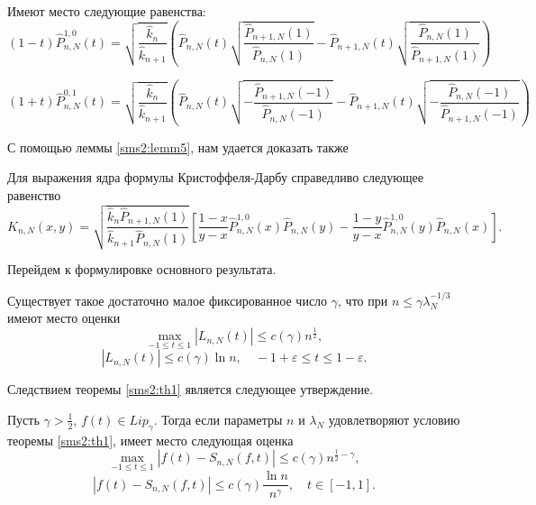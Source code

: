 \begin{lemma}
\label{sms2:lemm5}
Имеют место следующие равенства:
\begin{equation}
\label{SMS2.lemmaf1eq}
(1-t)\hat P_{n,N}^{1,0}(t) =
\sqrt{\frac{\hat{k}_n}{\hat{k}_{n+1}}}
\left(
\hat P_{n,N}(t)\sqrt{\frac{\hat P_{n+1,N}(1)}{\hat P_{n,N}(1)} }
  - \hat P_{n+1,N}(t)\sqrt{ \frac{\hat P_{n,N}(1)}{\hat P_{n+1,N}(1)} }
\right)
\end{equation}


\begin{equation}
\label{SMS2.lemmaf2eq}
(1+t)\hat P_{n,N}^{0,1}(t) =
\sqrt{\frac{\hat{k}_n}{\hat{k}_{n+1}}}
\left(
\hat P_{n,N}(t)\sqrt{-\frac{\hat P_{n+1,N}(-1)}{\hat P_{n,N}(-1)} }
  - \hat P_{n+1,N}(t)\sqrt{ -\frac{\hat P_{n,N}(-1)}{\hat P_{n+1,N}(-1)} }
\right)
\end{equation}
\end{lemma}

\noindent С помощью леммы \ref{sms2:lemm5}, нам удается доказать также

\begin{lemma}
\label{sms2:lemm6}
Для выражения ядра формулы Кристоффеля-Дарбу справедливо следующее равенство
\begin{equation}
\label{SMS2.kristof}
K_{n,N}(x,y) =
\sqrt{\frac{\hat{k}_{n} \hat P_{n+1,N}(1)}{\hat{k}_{n+1} \hat P_{n,N}(1)}}
\left[ \frac{1-x}{y-x}\hat P_{n,N}^{1,0}(x)\hat P_{n,N}(y) - \frac{1-y}{y-x}\hat P_{n,N}^{1, 0}(y)\hat P_{n,N}(x)
\right].
\end{equation}
\end{lemma}


\noindent Перейдем к формулировке основного результата.

\begin{theorem}
\label{sms2:th1}
Существует такое достаточно малое фиксированное число $\gamma$, что при $n \leq \gamma \lambda_N^{-1/3}$ имеют место оценки
\begin{equation*}
\max_{-1\leq t\leq 1} \left| L_{n,N}(t) \right| \leq c(\gamma) n^{\frac12},
\end{equation*}
\begin{equation*}
\left| L_{n,N}(t) \right| \leq c(\gamma) \ln{n}, \quad -1+\varepsilon \leq t \leq 1 - \varepsilon.
\end{equation*}
\end{theorem}

\noindent Следствием теоремы \ref{sms2:th1} является следующее утверждение.


\begin{theorem}
\label{sms2:th2}
Пусть $\gamma > \frac12$, $f(t) \in Lip_{\gamma}$. Тогда если параметры $n$ и $\lambda_N$ удовлетворяют условию теоремы \ref{sms2:th1}, имеет место следующая оценка
\begin{equation*}
\max_{-1\leq t\leq 1} \left| f(t) - S_{n,N}(f, t)\right| \leq c(\gamma) n^{\frac12 - \gamma},
\end{equation*}
\begin{equation*}
\left| f(t) - S_{n,N}(f, t)\right| \leq c(\gamma) \frac{\ln{n}}{n^{\gamma}}, \quad t \in [-1,1].
\end{equation*}
\end{theorem}
